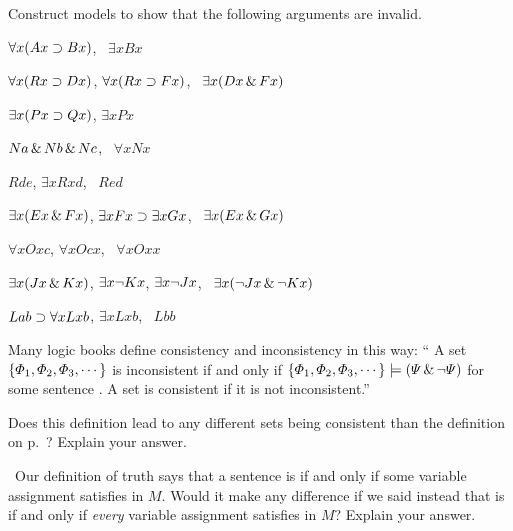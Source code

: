 \problempart
Construct models to show that the following arguments are invalid.
\begin{earg}
\item $\forall x(Ax \supset Bx)$, \therefore\ $\exists x Bx$
\item $\forall x(Rx \supset Dx)$, $\forall x(Rx \supset Fx)$, \therefore\ $\exists x(Dx \,\&\, Fx)$
\item $\exists x(Px\supset Qx)$, \therefore $\exists x Px$
\item $Na \,\&\, Nb \,\&\, Nc$, \therefore\ $\forall x Nx$
\item $Rde$, $\exists x Rxd$, \therefore\ $Red$
\item $\exists x(Ex \,\&\, Fx)$, $\exists x Fx \supset \exists x Gx$, \therefore\ $\exists x(Ex \,\&\, Gx)$
\item $\forall x Oxc$, $\forall x Ocx$, \therefore\ $\forall x Oxx$
\item $\exists x(Jx \,\&\, Kx)$, $\exists x \neg Kx$, $\exists x \neg Jx$, \therefore\ $\exists x(\neg Jx \,\&\, \neg Kx)$
\item $Lab \supset \forall x Lxb$, $\exists x Lxb$, \therefore\ $Lbb$
\end{earg}





\problempart
\label{pr.SemanticsEssay}
\begin{earg}
\item Many logic books define consistency and inconsistency in this way:
`` A set $\{\varPhi{}_1,\varPhi{}_2,\varPhi{}_3,\cdots\}$ is inconsistent if and only if $\{\varPhi{}_1,\varPhi{}_2,\varPhi{}_3,\cdots\}\models(\varPsi{}\,\&\,\neg\varPsi{})$ for some sentence \metaB{}. A set is consistent if it is not inconsistent.''

Does this definition lead to any different sets being consistent than the definition on  p.~\pageref{def.consistencySL}? Explain your answer.

\item\leftsolutions\ Our definition of truth says that a sentence \metaA{} is   if and only if some variable assignment satisfies \metaA{} in $M$. Would it make any difference if we said instead that \metaA{} is   if and only if \emph{every} variable assignment satisfies \metaA{} in $M$? Explain your answer.
\end{earg}
